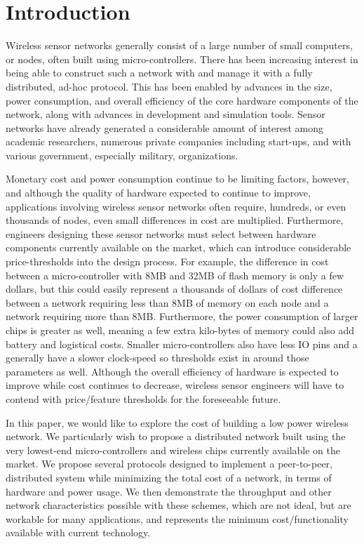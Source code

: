 \section{Introduction}

Wireless sensor networks generally consist of a large number of small computers, or nodes, often built using micro-controllers.
There has been increasing interest in being able to construct such a network with and manage it with a fully distributed,
ad-hoc protocol.  This has been enabled by advances in the size, power consumption, and overall efficiency of the
core hardware components of the network, along with advances in development and simulation tools.  Sensor networks have
already generated a considerable amount of interest among academic researchers, numerous private companies including
start-ups, and with various government, especially military, organizations.

Monetary cost and power consumption continue to be limiting factors, however, and although the quality of hardware expected to
continue to improve,
applications involving wireless sensor networks often require, hundreds, or even thousands of nodes,
even small differences in cost are multiplied.
Furthermore, engineers designing these sensor networks must select between hardware components currently available on
the market, which can introduce considerable price-thresholds into the design process.  For example, the difference in cost
between a micro-controller with 8MB and 32MB of flash memory is only a few dollars, but this could easily represent a
thousands of dollars of cost difference between a network requiring less than 8MB of memory on each node and a network
requiring more than 8MB.  Furthermore, the power consumption of larger chips is greater as well, meaning a few extra
kilo-bytes of memory could also add battery and logistical costs.  Smaller micro-controllers also have less IO pins and
a generally have a slower clock-speed so thresholds exist in around those parameters as well.  Although the overall efficiency of
hardware is expected to improve while cost continues to decrease, wireless sensor engineers will have to contend with price/feature
thresholds for the foreseeable future.

In this paper, we would like to explore the cost of building a low power wireless network.  We particularly wish to
propose a distributed network built using the very lowest-end micro-controllers and wireless chips currently available on the market.
We propose several protocols designed to implement a peer-to-peer, distributed system while minimizing the total cost
of a network, in terms of hardware and power usage.  We then demonstrate the throughput and
other network characteristics possible with these schemes, which are not ideal, but are workable for many applications, and
represents the minimum cost/functionality available with current technology.

